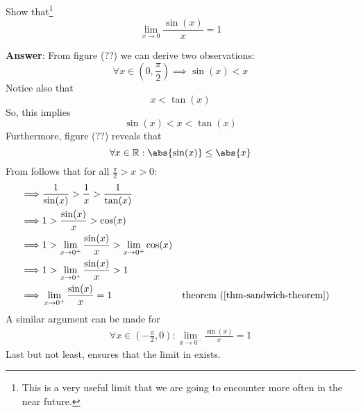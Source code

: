 \begin{exm}\label{exm-important-sin-over-x-limit}
    Show that\footnote{This is a very useful limit that we are going to encounter
    more often in the near future.}
    \begin{equation}\label{eq-important-sin-over-x-limit}
        \lim_{x \to 0}\frac{\sin(x)}{x}=1
    \end{equation}
    \begin{flushleft}
        \textbf{Answer}: From figure (??) we can derive two observations:
        \begin{equation*}
            \forall x\in\left(0,\frac{\pi}{2}\right)\implies \sin(x)<x
        \end{equation*}
        Notice also that
        \begin{equation*}
            x < \tan(x)
        \end{equation*}
        So, this implies
        \begin{equation}\label{eq-important-sin-over-x-limit:1}
            \sin(x) < x < \tan(x)
        \end{equation}
        Furthermore, figure (??) reveals that
        \begin{equation*}
            \forall x\in\mathbb{R}:\abs{\sin(x)}\leq\abs{x}
        \end{equation*}
        From  follows that for all
        $\tfrac{\pi}{2}>x>0$:
        \begin{align*}
            \implies 
            &\frac{1}{\sin(x)} > \frac{1}{x} > \frac{1}{\tan(x)} \\
            \implies 
            &1 > \frac{\sin(x)}{x} > \cos(x) \\
            \implies 
            &1 > \lim_{x \to 0^+}\frac{\sin(x)}{x} > \lim_{x \to 0^+}\cos(x) \\
            \implies
            &1 > \lim_{x \to 0^+}\frac{\sin(x)}{x} > 1\\
            \implies 
            &\lim_{x \to 0^+}\frac{\sin(x)}{x}=1 && \text{theorem (\ref{thm-sandwich-theorem})}
        \end{align*}
        A similar argument can be made for 
        \begin{align*}
            \forall x\in\left(-\frac{\pi}{2},0\right):\lim_{x \to 0^-}\frac{\sin(x)}{x}=1
        \end{align*}
        Last but not least,  ensures
        that the limit in  exists.
    \end{flushleft}
\end{exm}

